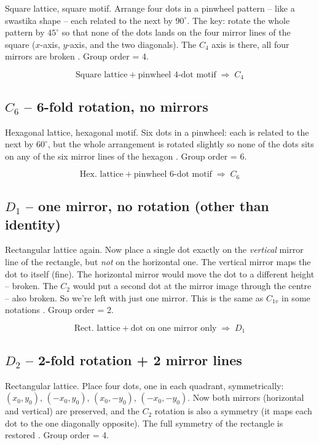 \documentclass[12pt,a4paper]{article}
\begin{document}
Square lattice, square motif. Arrange four dots in a pinwheel pattern -- like a
swastika shape -- each related to the next by $90^\circ$. The key: rotate the whole
pattern by $45^\circ$ so that none of the dots lands on the four mirror lines of the
square ($x$-axis, $y$-axis, and the two diagonals). The $C_4$ axis is there, all
four mirrors are broken \cite{Ashcroft1976}. Group order = 4.

\[
\boxed{\text{Square lattice} + \text{pinwheel 4-dot motif} \;\Rightarrow\; C_4}
\]

\subsection*{$C_6$ -- 6-fold rotation, no mirrors}

Hexagonal lattice, hexagonal motif. Six dots in a pinwheel: each is related to the
next by $60^\circ$, but the whole arrangement is rotated slightly so none of the dots
sits on any of the six mirror lines of the hexagon \cite{Hammond2015}. Group order = 6.

\[
\boxed{\text{Hex. lattice} + \text{pinwheel 6-dot motif} \;\Rightarrow\; C_6}
\]

\subsection*{$D_1$ -- one mirror, no rotation (other than identity)}

Rectangular lattice again. Now place a single dot exactly on the \emph{vertical}
mirror line of the rectangle, but \emph{not} on the horizontal one. The vertical
mirror maps the dot to itself (fine). The horizontal mirror would move the dot to
a different height -- broken. The $C_2$ would put a second dot at the mirror
image through the centre -- also broken. So we're left with just one mirror. This
is the same as $C_{1v}$ in some notations \cite{Bradley1972}. Group order = 2.

\[
\boxed{\text{Rect. lattice} + \text{dot on one mirror only} \;\Rightarrow\; D_1}
\]

\subsection*{$D_2$ -- 2-fold rotation + 2 mirror lines}

Rectangular lattice. Place four dots, one in each quadrant, symmetrically:
$(x_0, y_0)$, $(-x_0, y_0)$, $(x_0, -y_0)$, $(-x_0, -y_0)$. Now both mirrors
(horizontal and vertical) are preserved, and the $C_2$ rotation is also a symmetry
(it maps each dot to the one diagonally opposite). The full symmetry of the
rectangle is restored \cite{Kittel2005}. Group order = 4.
\end{document}
